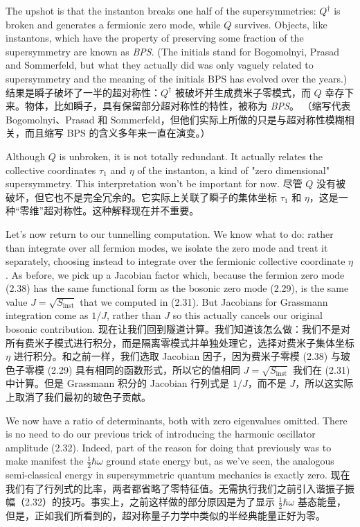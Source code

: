 \documentclass{article}
\begin{document}
\begin{paracol}{2}
The upshot is that the instanton breaks one half of the supersymmetries: $Q^{\dagger}$ is broken and generates a fermionic zero mode, while $Q$ survives. Objects, like instantons, which have the property of preserving some fraction of the supersymmetry are known as \textit{BPS}. (The initials stand for Bogomolnyi, Prasad and Sommerfeld, but what they actually did was only vaguely related to supersymmetry and the meaning of the initials BPS has evolved over the years.)
\switchcolumn
结果是瞬子破坏了一半的超对称性：$Q^{\dagger}$ 被破坏并生成费米子零模式，而 $Q$ 幸存下来。物体，比如瞬子，具有保留部分超对称性的特性，被称为 \textit{BPS}。 （缩写代表 Bogomolnyi、Prasad 和 Sommerfeld，但他们实际上所做的只是与超对称性模糊相关，而且缩写 BPS 的含义多年来一直在演变。）
\switchcolumn*

Although $Q$ is unbroken, it is not totally redundant. It actually relates the collective coordinates $\tau_1$ and $\eta$ of the instanton, a kind of "zero dimensional" supersymmetry. This interpretation won’t be important for now.
\switchcolumn
尽管 $Q$ 没有被破坏，但它也不是完全冗余的。它实际上关联了瞬子的集体坐标 $\tau_1$ 和 $\eta$，这是一种“零维”超对称性。这种解释现在并不重要。
\switchcolumn*

Let’s now return to our tunnelling computation. We know what to do: rather than integrate over all fermion modes, we isolate the zero mode and treat it separately, choosing instead to integrate over the fermionic collective coordinate $\eta$. As before, we pick up a Jacobian factor which, because the fermion zero mode (2.38) has the same functional form as the bosonic zero mode (2.29), is the same value $J = \sqrt{S_{\text{inst}}}$ that we computed in (2.31). But Jacobians for Grassmann integration come as $1 / J$, rather than $J$ so this actually cancels our original bosonic contribution.
\switchcolumn
现在让我们回到隧道计算。我们知道该怎么做：我们不是对所有费米子模式进行积分，而是隔离零模式并单独处理它，选择对费米子集体坐标 $\eta$ 进行积分。和之前一样，我们选取​ Jacobian 因子，因为费米子零模 (2.38) 与玻色子零模 (2.29) 具有相同的函数形式，所以它的值相同 $J = \sqrt{S_{\text{inst} }}$ 我们在 (2.31) 中计算。但是 Grassmann 积分的 Jacobian 行列式是 $1 / J$，而不是 $J$，所以这实际上取消了我们最初的玻色子贡献。
\switchcolumn*

We now have a ratio of determinants, both with zero eigenvalues omitted. There is no need to do our previous trick of introducing the harmonic oscillator amplitude (2.32). Indeed, part of the reason for doing that previously was to make manifest the $\frac{1}{2} \hbar \omega$ ground state energy but, as we’ve seen, the analogous semi-classical energy in supersymmetric quantum mechanics is exactly zero.
\switchcolumn
现在我们有了行列式的比率，两者都省略了零特征值。无需执行我们之前引入谐振子振幅（2.32）的技巧。事实上，之前这样做的部分原因是为了显示 $\frac{1}{2} \hbar \omega$ 基态能量，但是，正如我们所看到的，超对称量子力学中类似的半经典能量正好为零。
\switchcolumn*

\end{paracol}
\end{document}
